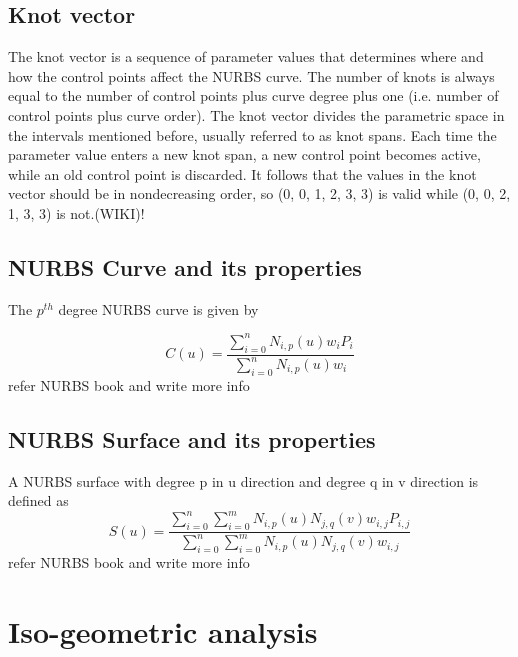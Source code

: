 \documentclass[12pt]{article}
\begin{document}
	\subsection{Knot vector }
	The knot vector is a sequence of parameter values that determines where and how the control points affect the NURBS curve. The number of knots is always equal to the number of control points plus curve degree plus one (i.e. number of control points plus curve order). The knot vector divides the parametric space in the intervals mentioned before, usually referred to as knot spans. Each time the parameter value enters a new knot span, a new control point becomes active, while an old control point is discarded. It follows that the values in the knot vector should be in nondecreasing order, so (0, 0, 1, 2, 3, 3) is valid while (0, 0, 2, 1, 3, 3) is not.(WIKI)!
	\subsection{NURBS Curve and its properties }
	The $p^{th}$ degree NURBS curve is given by

	\begin{equation}
	C(u) = \frac{\sum_{i=0}^{n}N_{i,p}(u)w_{i}P_{i}}{\sum_{i=0}^{n}N_{i,p}(u)w_{i}}
	\end{equation}
	refer NURBS book and write more info
	\subsection{NURBS Surface and its properties }
	A NURBS surface with degree p in u direction and degree q in v direction is defined as
	\begin{equation}
	S(u) = \frac{\sum_{i=0}^{n}\sum_{i=0}^{m}N_{i,p}(u)N_{j,q}(v)w_{i,j}P_{i,j}}{\sum_{i=0}^{n}\sum_{i=0}^{m}N_{i,p}(u)N_{j,q}(v)w_{i,j}}
	\end{equation}
	refer NURBS book and write more info
	\section{Iso-geometric analysis}
	
	
	
	
	
\end{document}
